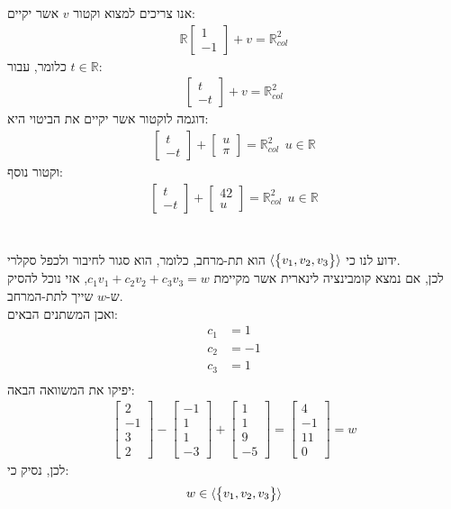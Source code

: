 \documentclass[a4paper, 12pt, leqno]{article}
\newcommand{\eq}[1]{\begin{align*}#1\end{align*}}
\newcommand{\set}[1]{\big{\{} #1 \big{\}}}
\begin{document}
\section{}
אנו צריכים למצוא וקטור $v$ אשר יקיים:
\eq{
    \mathbb{R}\begin{bmatrix}1\\-1\end{bmatrix}+v=\mathbb{R}^2_{col}
}
כלומר, עבור $t\in\mathbb{R}$:
\eq{
    \begin{bmatrix}t\\-t\end{bmatrix}+v=\mathbb{R}^2_{col}
}
דוגמה לוקטור אשר יקיים את הביטוי היא:
\eq{
    \begin{bmatrix}t\\-t\end{bmatrix}+\begin{bmatrix}u\\\pi\end{bmatrix}=\mathbb{R}^2_{col}~~u\in\mathbb{R}
}
וקטור נוסף:
\eq{
    \begin{bmatrix}t\\-t\end{bmatrix}+\begin{bmatrix}42\\u\end{bmatrix}=\mathbb{R}^2_{col}~~u\in\mathbb{R}
}


\pagebreak
\setcounter{section}{30}
\section{}
ידוע לנו כי $\langle\set{v_1,v_2,v_3}\rangle$ הוא תת-מרחב, כלומר, הוא סגור לחיבור ולכפל סקלרי.\\
לכן, אם נמצא קומבינציה לינארית אשר מקיימת $c_1v_1+c_2v_2+c_3v_3=w$, אזי נוכל להסיק ש-$w$ שייך לתת-המרחב.\\
ואכן המשתנים הבאים:
\eq{
    c_1&=1\\
    c_2&=-1\\
    c_3&=1\\
}
יפיקו את המשוואה הבאה:
\eq{
    \begin{bmatrix}
        2\\-1\\3\\2
    \end{bmatrix}
    -
    \begin{bmatrix}
        -1\\1\\1\\-3
    \end{bmatrix}
    +
    \begin{bmatrix}
        1\\1\\9\\-5
    \end{bmatrix}
    =
    \begin{bmatrix}
        4\\-1\\11\\0
    \end{bmatrix}
    =w
}
לכן, נסיק כי:
\eq{
    w\in{\langle\set{v_1,v_2,v_3}\rangle}
}

\end{document}

